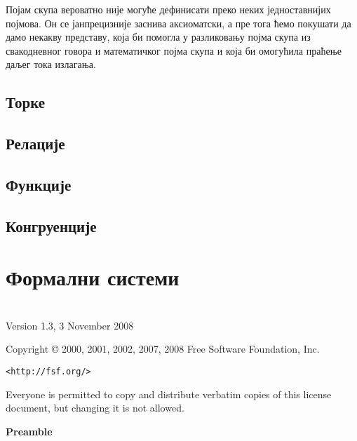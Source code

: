 \documentclass[a4paper]{book}
\begin{document}
\indent

Појам скупа вероватно није могуће дефинисати преко неких једноставнијих појмова. Он се јанпрецизније
заснива аксиоматски, а пре тога ћемо покушати да дамо некакву представу, која би помогла у разликовању
појма скупа из свакодневног говора и математичког појма скупа и која би омогућила праћење даљег тока
излагања.

\section{Торке}

\section{Релације}

\section{Функције}

\section{Конгруенције}
	
\chapter{Формални системи}

\chapter*{}

 \begin{center}

       Version 1.3, 3 November 2008


 Copyright \copyright{} 2000, 2001, 2002, 2007, 2008  Free Software Foundation, Inc.
 
 \bigskip
 
     \texttt{<http://fsf.org/>}
  
 \bigskip
 
 Everyone is permitted to copy and distribute verbatim copies
 of this license document, but changing it is not allowed.
\end{center}


\begin{center}
{\bf\large Preamble}
\end{center}
\end{document}
